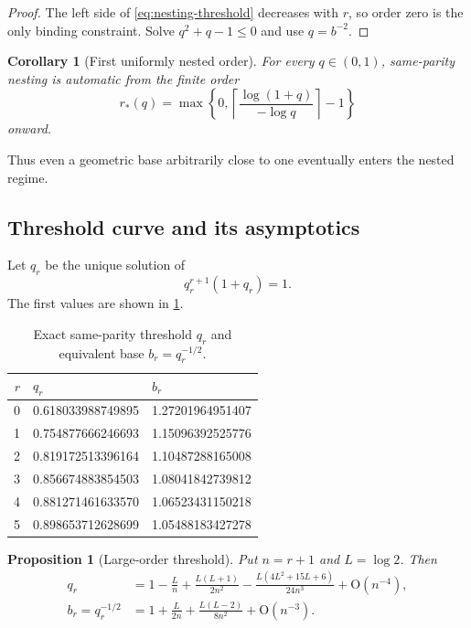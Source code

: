 \documentclass[11pt,oneside]{article}
\numberwithin{equation}{section}
\theoremstyle{frontier}
\newtheorem{proposition}[theorem]{Proposition}
\newtheorem{corollary}[theorem]{Corollary}
\theoremstyle{definition}
\theoremstyle{remark}
\newcommand{\bigO}{\mathrm O}
\begin{document}
\begin{proof}
The left side of \eqref{eq:nesting-threshold} decreases with $r$, so order zero is the only
binding constraint.  Solve $q^2+q-1\le0$ and use $q=b^{-2}$.
\end{proof}

\begin{corollary}[First uniformly nested order]\label{cor:first-order}
For every $q\in(0,1)$, same-parity nesting is automatic from the finite order
\begin{equation}
 r_*(q)=\max\!\left\{0,
 \left\lceil\frac{\log(1+q)}{-\log q}\right\rceil-1\right\}
 \label{eq:rstar}
\end{equation}
onward.
\end{corollary}

Thus even a geometric base arbitrarily close to one eventually enters the nested regime.

\subsection{Threshold curve and its asymptotics}

Let $q_r$ be the unique solution of
\begin{equation}
 q_r^{r+1}(1+q_r)=1.
 \label{eq:qrdef}
\end{equation}
The first values are shown in \cref{tab:thresholds}.

\begin{table}[htbp]
\centering
\caption{Exact same-parity threshold $q_r$ and equivalent base $b_r=q_r^{-1/2}$.}
\label{tab:thresholds}
\begin{tabular}{@{}rll@{}}
\toprule
$r$ & $q_r$ & $b_r$\\
\midrule
0 & 0.618033988749895 & 1.27201964951407\\
1 & 0.754877666246693 & 1.15096392525776\\
2 & 0.819172513396164 & 1.10487288165008\\
3 & 0.856674883854503 & 1.08041842739812\\
4 & 0.881271461633570 & 1.06523431150218\\
5 & 0.898653712628699 & 1.05488183427278\\
\bottomrule
\end{tabular}
\end{table}

\begin{proposition}[Large-order threshold]\label{prop:threshold-asymptotic}
Put $n=r+1$ and $L=\log2$.  Then
\begin{align}
 q_r
 &=1-\frac{L}{n}+\frac{L(L+1)}{2n^2}
   -\frac{L(4L^2+15L+6)}{24n^3}+\bigO(n^{-4}),
 \label{eq:qr-asymptotic}\\
 b_r=q_r^{-1/2}
 &=1+\frac{L}{2n}+\frac{L(L-2)}{8n^2}+\bigO(n^{-3}).
 \label{eq:br-asymptotic}
\end{align}
\end{proposition}
\end{document}
